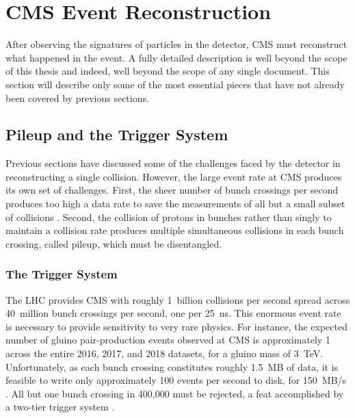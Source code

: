 \section{CMS Event Reconstruction} \label{sec:reconstruction}

After observing the signatures of particles in the detector, CMS must reconstruct what happened in the event.
A fully detailed description is well beyond the scope of this thesis and indeed, well beyond the scope of any single document.
This section will describe only some of the most essential pieces that have not already been covered by previous sections.

  \subsection{Pileup and the Trigger System} \label{sec:pileupandtrigger}

  Previous sections have discussed some of the challenges faced by the detector in reconstructing a single collision.
  However, the large event rate at CMS produces its own set of challenges.
  First, the sheer number of bunch crossings per second produces too high a data rate to save the measurements of all but a small subset of collisions \cite{cms_tdr}.
  Second, the collision of protons in bunches rather than singly to maintain a collision rate produces multiple simultaneous collisions in each bunch crossing, called pileup, which must be disentangled.
  
    \subsubsection{The Trigger System} \label{sec:trigger}

    The LHC provides CMS with roughly 1~billion collisions per second spread across 40~million bunch crossings per second, one per 25~ns.
    This enormous event rate is necessary to provide sensitivity to very rare physics.
    For instance, the expected number of gluino pair-production events observed at CMS is approximately 1 across the entire 2016, 2017, and 2018 datasets, for a gluino mass of 3~TeV.
    Unfortunately, as each bunch crossing constitutes roughly 1.5~MB of data, it is feasible to write only approximately 100 events per second to disk, for 150~MB/s \cite{cms_tdr}.
    All but one bunch crossing in 400,000 must be rejected, a feat accomplished by a two-tier trigger system \cite{trigger}.
    
